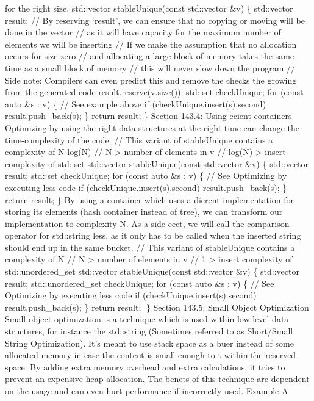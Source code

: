 for the right size. std::vector stableUnique(const std::vector \&v) \{
std::vector result; // By reserving `result', we can ensure that no
copying or moving will be done in the vector // as it will have capacity
for the maximum number of elements we will be inserting // If we make
the assumption that no allocation occurs for size zero // and allocating
a large block of memory takes the same time as a small block of memory
// this will never slow down the program // Side note: Compilers can
even predict this and remove the checks the growing from the generated
code result.reserve(v.size()); std::set checkUnique; for (const auto \&s
: v) \{ // See example above if (checkUnique.insert(s).second)
result.push\_back(s); \} return result; \} Section 143.4: Using ecient
containers Optimizing by using the right data structures at the right
time can change the time-complexity of the code. // This variant of
stableUnique contains a complexity of N log(N) // N \textgreater{}
number of elements in v // log(N) \textgreater{} insert complexity of
std::set std::vector stableUnique(const std::vector \&v) \{ std::vector
result; std::set checkUnique; for (const auto \&s : v) \{ // See
Optimizing by executing less code if (checkUnique.insert(s).second)
result.push\_back(s); \} return result; \} By using a container which
uses a dierent implementation for storing its elements (hash container
instead of tree), we can transform our implementation to complexity N.
As a side eect, we will call the comparison operator for std::string
less, as it only has to be called when the inserted string should end up
in the same bucket. // This variant of stableUnique contains a
complexity of N // N \textgreater{} number of elements in v // 1
\textgreater{} insert complexity of std::unordered\_set std::vector
stableUnique(const std::vector \&v) \{ std::vector result;
std::unordered\_set checkUnique; for (const auto \&s : v) \{ // See
Optimizing by executing less code if (checkUnique.insert(s).second)
result.push\_back(s); \} return result; \} Section 143.5: Small Object
Optimization Small object optimization is a technique which is used
within low level data structures, for instance the std::string
(Sometimes referred to as Short/Small String Optimization). It's meant
to use stack space as a buer instead of some allocated memory in case
the content is small enough to t within the reserved space. By adding
extra memory overhead and extra calculations, it tries to prevent an
expensive heap allocation. The benets of this technique are dependent on
the usage and can even hurt performance if incorrectly used. Example A
